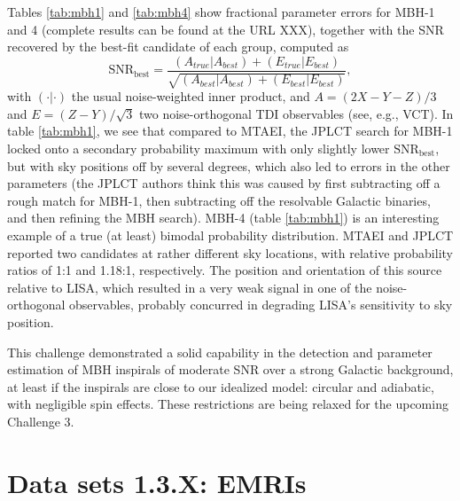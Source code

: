 \documentclass{iopart}
\begin{document}
Tables \ref{tab:mbh1} and \ref{tab:mbh4} show fractional parameter errors for MBH-1 and 4 (complete results can be found at the URL XXX), together with the SNR recovered by the best-fit candidate of each group, computed as 
%
\begin{equation}
\mathrm{SNR}_\mathrm{best}  = \frac{(A_{true}|A_{best}) + (E_{true}|E_{best})}
{\sqrt{(A_{best}|A_{best}) + (E_{best}|E_{best})}},
\end{equation}
%
with $(\cdot|\cdot)$ the usual noise-weighted inner product, and $A = (2X - Y - Z)/3$ and $E = (Z-Y)/\sqrt{3}$ two noise-orthogonal TDI observables (see, e.g., VCT). In table \ref{tab:mbh1}, we see that compared to MTAEI, the JPLCT search for MBH-1 locked onto a secondary probability maximum with only slightly lower $\mathrm{SNR}_\mathrm{best}$, but with sky positions off by several degrees, which also led to errors in the other parameters (the JPLCT authors think this was caused by first subtracting off a rough match for MBH-1, then subtracting off the resolvable Galactic binaries, and then refining the MBH search). MBH-4 (table \ref{tab:mbh1}) is an interesting example of a true (at least) bimodal probability distribution. MTAEI and JPLCT reported two candidates at rather different sky locations, with relative probability ratios of 1:1 and 1.18:1, respectively. The position and orientation of this source relative to LISA, which resulted in a very weak signal in one of the noise-orthogonal observables, probably concurred in degrading LISA's sensitivity to sky position.

This challenge demonstrated a solid capability in the detection and parameter estimation of MBH inspirals of moderate SNR over a strong Galactic background, at least if the inspirals are close to our idealized model: circular and adiabatic, with negligible spin effects. These restrictions are being relaxed for the upcoming Challenge 3.

\section{Data sets 1.3.X: EMRIs}
\end{document}
